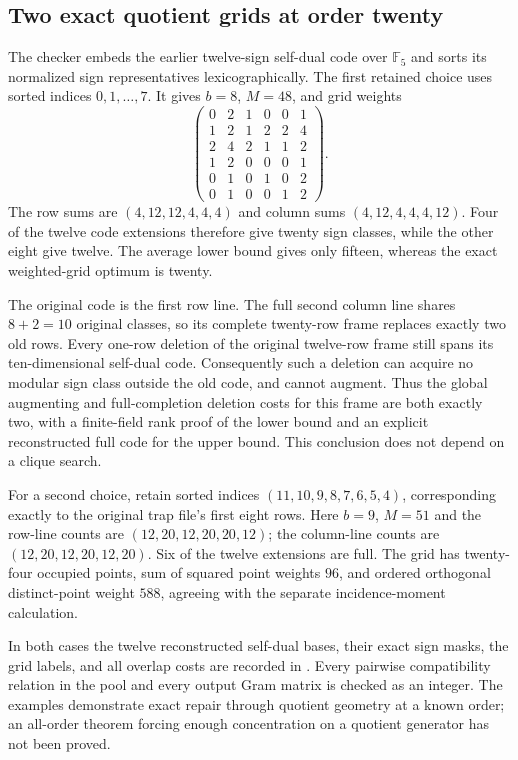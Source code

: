 \subsection{Two exact quotient grids at order twenty}
The checker embeds the earlier twelve-sign self-dual code over
$\mathbb F_5$ and sorts its normalized sign representatives
lexicographically. The first retained choice uses sorted indices
$0,1,\ldots,7$. It gives $b=8$, $M=48$, and grid weights
\[
\begin{pmatrix}
0&2&1&0&0&1\\1&2&1&2&2&4\\2&4&2&1&1&2\\
1&2&0&0&0&1\\0&1&0&1&0&2\\0&1&0&0&1&2
\end{pmatrix}.
\]
The row sums are $(4,12,12,4,4,4)$ and column sums
$(4,12,4,4,4,12)$. Four of the twelve code extensions therefore
give twenty sign classes, while the other eight give twelve.
The average lower bound gives only fifteen, whereas the exact
weighted-grid optimum is twenty.

The original code is the first row line. The full second column
line shares $8+2=10$ original classes, so its complete twenty-row
frame replaces exactly two old rows. Every one-row deletion of
the original twelve-row frame still spans its ten-dimensional
self-dual code. Consequently such a deletion can acquire no modular
sign class outside the old code, and cannot augment. Thus the
global augmenting and full-completion deletion costs for this
frame are both exactly two, with a finite-field rank proof of
the lower bound and an explicit reconstructed full code for the
upper bound. This conclusion does not depend on a clique search.

For a second choice, retain sorted indices
$(11,10,9,8,7,6,5,4)$, corresponding exactly to the original trap
file's first eight rows. Here $b=9$, $M=51$ and the row-line counts
are $(12,20,12,20,20,12)$; the column-line counts are
$(12,20,12,20,12,20)$. Six of the twelve extensions are full.
The grid has twenty-four occupied points, sum of squared point
weights $96$, and ordered orthogonal distinct-point weight $588$,
agreeing with the separate incidence-moment calculation.

In both cases the twelve reconstructed self-dual bases, their exact
sign masks, the grid labels, and all overlap costs are recorded in
. Every pairwise compatibility relation
in the pool and every output Gram matrix is checked as an integer.
The examples demonstrate exact repair through quotient geometry at
a known order; an all-order theorem forcing enough concentration
on a quotient generator has not been proved.

